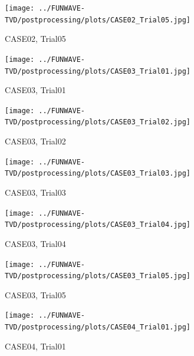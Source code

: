 \documentclass[preprint,10pt]{elsarticle}
\begin{document}
\begin{figure}
\begin{center}
 \texttt{[image: ../FUNWAVE-TVD/postprocessing/plots/CASE02\_Trial05.jpg]}
 \caption{CASE02, Trial05}
 \label{lineargrid}
 \end{center}
 \end{figure}

 \begin{figure}
\begin{center}
 \texttt{[image: ../FUNWAVE-TVD/postprocessing/plots/CASE03\_Trial01.jpg]}
 \caption{CASE03, Trial01}
 \label{lineargrid}
 \end{center}
 \end{figure}

\begin{figure}
\begin{center}
 \texttt{[image: ../FUNWAVE-TVD/postprocessing/plots/CASE03\_Trial02.jpg]}
 \caption{CASE03, Trial02}
 \label{lineargrid}
 \end{center}
 \end{figure}

\begin{figure}
\begin{center}
 \texttt{[image: ../FUNWAVE-TVD/postprocessing/plots/CASE03\_Trial03.jpg]}
 \caption{CASE03, Trial03}
 \label{lineargrid}
 \end{center}
 \end{figure}
 
\begin{figure}
\begin{center}
 \texttt{[image: ../FUNWAVE-TVD/postprocessing/plots/CASE03\_Trial04.jpg]}
 \caption{CASE03, Trial04}
 \label{lineargrid}
 \end{center}
 \end{figure}

\begin{figure}
\begin{center}
 \texttt{[image: ../FUNWAVE-TVD/postprocessing/plots/CASE03\_Trial05.jpg]}
 \caption{CASE03, Trial05}
 \label{lineargrid}
 \end{center}
 \end{figure}

 \begin{figure}
\begin{center}
 \texttt{[image: ../FUNWAVE-TVD/postprocessing/plots/CASE04\_Trial01.jpg]}
 \caption{CASE04, Trial01}
 \label{lineargrid}
 \end{center}
 \end{figure}
\end{document}
